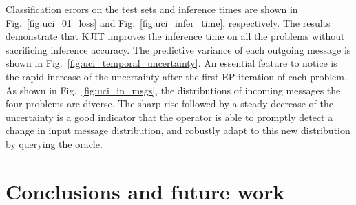 \documentclass[english]{article}
\theoremstyle{plain}
\theoremstyle{plain}
\newcommand{\figref}[1]{Fig.~\ref{#1}}
\begin{document}
Classification errors on the test sets and inference times are shown in 
\figref{fig:uci_01_loss} and \figref{fig:uci_infer_time}, respectively.
The results demonstrate that KJIT improves the inference time on all the 
problems without sacrificing inference accuracy. The  predictive 
variance of each outgoing message is shown in 
\figref{fig:uci_temporal_uncertainty}. An essential feature to notice is the 
rapid increase of the uncertainty after the first EP iteration of each problem. 
As shown in \figref{fig:uci_in_msgs}, the distributions of incoming messages 
 the four problems are diverse. 
The sharp rise followed by a steady decrease of the uncertainty is a good indicator 
that the operator is able to promptly detect a change in input message distribution,
and robustly adapt to this new distribution by querying the oracle.








\section{Conclusions and future work\label{sec:Conclusions-and-Future} }
\end{document}
